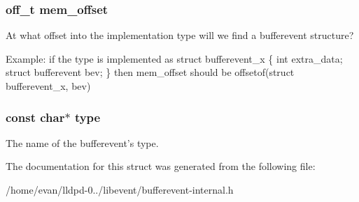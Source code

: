 \subsubsection[{mem\-\_\-offset}]{\setlength{\rightskip}{0pt plus 5cm}off\-\_\-t {\bf mem\-\_\-offset}}\label{structbufferevent__ops_afb18b58d46332cdc01a91ddff9f43c84}
\-At what offset into the implementation type will we find a bufferevent structure?

\-Example\-: if the type is implemented as struct bufferevent\-\_\-x \{ int extra\-\_\-data; struct bufferevent bev; \} then mem\-\_\-offset should be offsetof(struct bufferevent\-\_\-x, bev) 
\subsubsection[{type}]{\setlength{\rightskip}{0pt plus 5cm}const char$\ast$ {\bf type}}\label{structbufferevent__ops_a763fd8db6bba8fbbbc113ca0d61c47c2}
\-The name of the bufferevent's type. 

\-The documentation for this struct was generated from the following file\-:\begin{DoxyCompactItemize}
\item 
/home/evan/lldpd-\/0../libevent/bufferevent-\/internal.\-h\end{DoxyCompactItemize}
